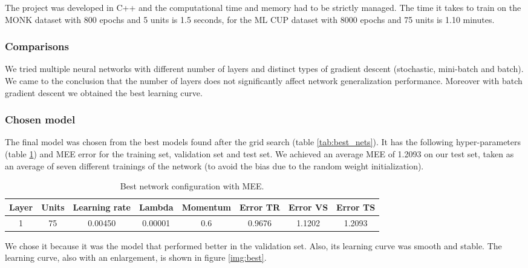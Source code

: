 The project was developed in C++ and the computational time and memory had to be strictly managed.
The time it takes to train on the MONK dataset with 800 epochs and 5 units is 1.5 seconds, for the ML CUP dataset with 8000 epochs and 75 units is 1.10 minutes.

\subsubsection{Comparisons}
We tried multiple neural networks with different number of layers and distinct types of gradient descent (stochastic, mini-batch and batch). We came to the conclusion that the number of layers does not significantly affect network generalization performance. Moreover with batch gradient descent we obtained the best learning curve.

\subsubsection{Chosen model}
The final model was chosen from the best models found after the grid search (table \ref{tab:best_nets}). It has the following hyper-parameters (table \ref{tab:best_net}) and MEE error for the training set, validation set and test set.
We achieved an average MEE of 1.2093 on our test set, taken as an average of seven
different trainings of the network (to avoid the bias due to the random weight
initialization).

\vspace{0.5cm}
\begin{center} 
\small\addtolength{\tabcolsep}{-3pt}
\begin{table}[h!]
	\centering
	\begin{tabular}{|c|c|c|c|c|c|c|c|}
		\hline
		\textbf{Layer}& \textbf{Units}& \textbf{Learning rate} & \multicolumn{1}{l|}{\textbf{Lambda}} & \textbf{Momentum} & \textbf{Error TR}& \textbf{Error VS}& \textbf{Error TS}\\ \hline
		1 & 75 & 0.00450 & 0.00001 & 0.6  & 0.9676 & 1.1202 & 1.2093  \\
		\hline
	\end{tabular}
	\caption{Best network configuration with MEE.}
	\label{tab:best_net}
\end{table}
\end{center}

We chose it because it was the model that performed better in the validation set. Also, its learning curve was smooth and stable.
The learning curve, also with an enlargement, is shown in figure \ref{img:best}.

